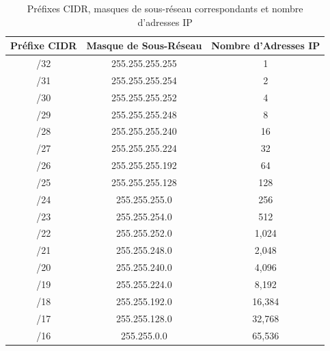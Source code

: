 \documentclass[12pt]{article}
\begin{document}
\begin{table}[h]
    \centering
    \begin{tabular}{|c|c|c|}
    \hline
    Préfixe CIDR & Masque de Sous-Réseau & Nombre d'Adresses IP \\
    \hline
    /32 & 255.255.255.255 & 1 \\
    \hline
    /31 & 255.255.255.254 & 2 \\
    \hline
    /30 & 255.255.255.252 & 4 \\
    \hline
    /29 & 255.255.255.248 & 8 \\
    \hline
    /28 & 255.255.255.240 & 16 \\
    \hline
    /27 & 255.255.255.224 & 32 \\
    \hline
    /26 & 255.255.255.192 & 64 \\
    \hline
    /25 & 255.255.255.128 & 128 \\
    \hline
    /24 & 255.255.255.0 & 256 \\
    \hline
    /23 & 255.255.254.0 & 512 \\
    \hline
    /22 & 255.255.252.0 & 1,024 \\
    \hline
    /21 & 255.255.248.0 & 2,048 \\
    \hline
    /20 & 255.255.240.0 & 4,096 \\
    \hline
    /19 & 255.255.224.0 & 8,192 \\
    \hline
    /18 & 255.255.192.0 & 16,384 \\
    \hline
    /17 & 255.255.128.0 & 32,768 \\
    \hline
    /16 & 255.255.0.0 & 65,536 \\
    \hline
    \end{tabular}
    \caption{Préfixes CIDR, masques de sous-réseau correspondants et nombre d'adresses IP}
    \label{tab:cidr}
\end{table}
\end{document}
